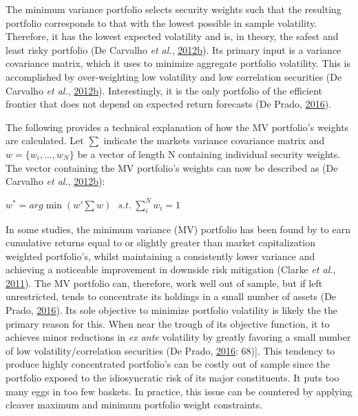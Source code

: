 \documentclass[11pt,preprint, authoryear]{elsarticle}
\numberwithin{equation}{section}
\numberwithin{figure}{section}
\numberwithin{table}{section}
\begin{document}
The minimum variance portfolio selects security weights such that the
resulting portfolio corresponds to that with the lowest possible in
sample volatility. Therefore, it has the lowest expected volatility and
is, in theory, the safest and least risky portfolio (De Carvalho
\emph{et al.},
\protect\hyperlink{ref-rawl2012}{2012}\protect\hyperlink{ref-rawl2012}{b}).
Its primary input is a variance covariance matrix, which it uses to
minimize aggregate portfolio volatility. This is accomplished by
over-weighting low volatility and low correlation securities (De
Carvalho \emph{et al.},
\protect\hyperlink{ref-rawl2012}{2012}\protect\hyperlink{ref-rawl2012}{b}).
Interestingly, it is the only portfolio of the efficient frontier that
does not depend on expected return forecasts (De Prado,
\protect\hyperlink{ref-lopez}{2016}).

The following provides a technical explanation of how the MV portfolio's
weights are calculated. Let \(\sum\) indicate the markets variance
covariance matrix and \(w=\{w_i,..., w_N \}\) be a vector of length N
containing individual security weights. The vector containing the MV
portfolio's weights can now be described as (De Carvalho \emph{et al.},
\protect\hyperlink{ref-rawl2012}{2012}\protect\hyperlink{ref-rawl2012}{b}):

\begin{center}
$w^*=arg\min(w'\sum w)\ \ \ s.t.\ \sum^N_iw_i=1$ 
\end{center}

In some studies, the minimum variance (MV) portfolio has been found by
to earn cumulative returns equal to or slightly greater than market
capitalization weighted portfolio's, whilst maintaining a consistently
lower variance and achieving a noticeable improvement in downside risk
mitigation (Clarke \emph{et al.},
\protect\hyperlink{ref-clarke2011}{2011}). The MV portfolio can,
therefore, work well out of sample, but if left unrestricted, tends to
concentrate its holdings in a small number of assets (De Prado,
\protect\hyperlink{ref-lopez}{2016}). Its sole objective to minimize
portfolio volatility is likely the the primary reason for this. When
near the trough of its objective function, it to achieves minor
reductions in \emph{ex ante} volatility by greatly favoring a small
number of low volatility/correlation securities (De Prado,
\protect\hyperlink{ref-lopez}{2016}: 68){]}. This tendency to produce
highly concentrated portfolio's can be costly out of sample since the
portfolio exposed to the idiosyncratic risk of its major constituents.
It puts too many eggs in too few baskets. In practice, this issue can be
countered by applying cleaver maximum and minimum portfolio weight
constraints.
\end{document}
